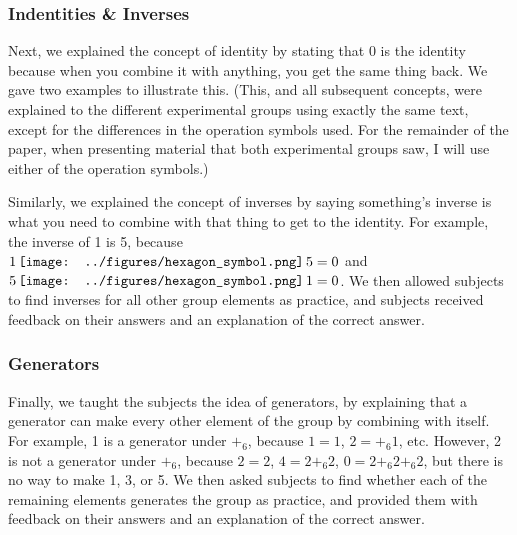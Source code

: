 \documentclass[man,10pt]{apa6}
\newcommand{\hex}{\,\vcenter{\hbox{\texttt{[image: ../figures/hexagon\_symbol.png]}}}\,}
\begin{document}
\subsubsection{Indentities \& Inverses}
Next, we explained the concept of identity by stating that 0 is the identity because when you combine it with anything, you get the same thing back. We gave two examples to illustrate this. (This, and all subsequent concepts, were explained to the different experimental groups using exactly the same text, except for the differences in the operation symbols used. For the remainder of the paper, when presenting material that both experimental groups saw, I will use either of the operation symbols.)\par
Similarly, we explained the concept of inverses by saying something's inverse is what you need to combine with that thing to get to the identity. For example, the inverse of 1 is 5, because $1 \hex 5 = 0$ and $5 \hex 1 = 0$. We then allowed subjects to find inverses for all other group elements as practice, and subjects received feedback on their answers and an explanation of the correct answer.
\subsubsection{Generators}
Finally, we taught the subjects the idea of generators, by explaining that a generator can make every other element of the group by combining with itself. For example, 1 is a generator under $+_6$, because $1 = 1$, $2 = +_6 1$, etc. However, 2 is not a generator under $+_6$, because $2 = 2$, $4 = 2 +_6 2$, $0 = 2 +_6 2 +_6 2$, but there is no way to make 1, 3, or 5. We then asked subjects to find whether each of the remaining elements generates the group as practice, and provided them with feedback on their answers and an explanation of the correct answer.
\end{document}
